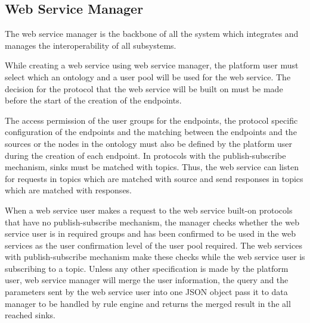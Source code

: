 \subsection{Web Service Manager}

The web service manager is the backbone of all the system which integrates and manages the interoperability of all subsystems.  

While creating a web service using web service manager, the platform user must select which an ontology and a user pool will be used for the web service. The decision for the protocol that the web service will be built on must be made before the start of the creation of the endpoints. 

The access permission of the user groups for the endpoints, the protocol specific configuration of the endpoints and the matching between the endpoints and the sources or the nodes in the ontology must also be defined by the platform user during the creation of each endpoint. In protocols with the publish-subscribe mechanism, sinks must be matched with topics. Thus, the web service can listen for requests in topics which are matched with source and send responses in topics which are matched with responses.

When a web service user makes a request to the web service built-on protocols that have no publish-subscribe mechanism, the manager checks whether the web service user is in required groups and has been confirmed to be used in the web services as the user confirmation level of the user pool required. The web services with publish-subscribe mechanism make these checks while the web service user is subscribing to a topic. Unless any other specification is made by the platform user, web service manager will merge the user information, the query and the parameters sent by the web service user into one JSON object pass it to data manager to be handled by rule engine and returns the merged result in the all reached sinks. 
